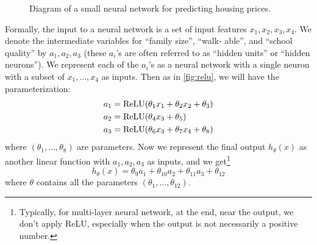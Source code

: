 \begin{figure}
\begin{center}
\end{center}
\caption{
    \label{fig:nn_house}
    Diagram of a small neural network for predicting housing prices.
}
\end{figure}

Formally, the input to a neural network is a set of input features
$x_1 ,x_2 ,x_3 ,x_4$. We denote the intermediate variables for ``family size'', ``walk-
able'', and ``school quality'' by $a_1 ,a_2 ,a_3$ (these $a_i$'s are often referred to as
``hidden units'' or ``hidden neurons''). We represent each of the $a_i$'s as a neural
network with a single neuron with a subset of $x_1 ,\ldots,x_4$ as inputs. Then
as in \cref{fig:relu}, we will have the parameterization:
\begin{align*}
    a_1 &= \operatorname{ReLU}(\theta_{1} x_1 + \theta_2 x_2 + \theta_3 )\\
    a_2 &= \operatorname{ReLU}(\theta_4 x_3 + \theta_5 )\\
    a_3 &= \operatorname{ReLU}(\theta_6 x_3 + \theta_7 x_4 + \theta_8 )
\end{align*}
where $(\theta_{1} ,\ldots ,\theta_8)$ are parameters. Now we represent the final output $h_\theta(x)$ %
as another linear function with $a_1 ,a_2 ,a_3$ as inputs, and we get\footnote{
Typically, for multi-layer neural network, at the end, near the output, we don't apply
ReLU, especially when the output is not necessarily a positive number.
}
\begin{equation}\label{eq:eg_nn}
    h_\theta(x) = \theta_9 a_1 + \theta_{10} a_2 + \theta_{11} a_3 + \theta_{12}
\end{equation}
where $\theta$ contains all the parameters $(\theta_{1} ,\ldots ,\theta_{12} )$. %

